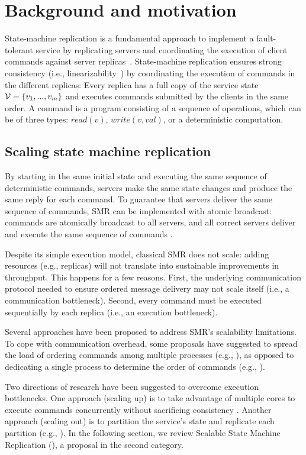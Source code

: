 \section{Background and motivation}
State-machine replication is a fundamental approach to implement a fault-tolerant service by replicating servers and coordinating the execution of client commands against server replicas~\cite{Lam78,Sch90}. 
State-machine replication ensures strong consistency (i.e., linearizability~\cite{Attiya04}) by coordinating the execution of commands in the different replicas: Every replica has a full copy of the service state $\mathcal{V} = \{v_1, ..., v_m\}$ and executes commands submitted by the clients in the same order. A command is a program consisting of a sequence of operations, which can be of three types: $read(v)$, $write(v, val)$, or a deterministic computation.

\subsection{Scaling state machine replication}
By starting in the same initial state and executing the same sequence of deterministic commands, servers make the same state changes and produce the same reply for each command. To guarantee that servers deliver the same sequence of commands, SMR can be implemented with atomic broadcast: commands are atomically broadcast to all servers, and all correct servers deliver and execute the same sequence of commands \cite{BJ87b,DSU04}.

Despite its simple execution model, classical SMR does not scale: adding resources (e.g., replicas) will not translate into sustainable improvements in throughput. This happens for a few reasons. First, the underlying communication protocol needed to ensure ordered message delivery may not scale itself (i.e., a communication bottleneck). Second, every command must be executed sequentially by each replica (i.e., an execution bottleneck).

Several approaches have been proposed to address SMR's scalability limitations. To cope with communication overhead, some proposals have suggested to spread the load of ordering commands among multiple processes (e.g., \cite{Moraru:2013gw,Mencius,Marandi:2012hb}), as opposed to dedicating a single process to determine the order of commands (e.g., \cite{CT96,Lamport:1998ea}).

Two directions of research have been suggested to overcome execution bottlenecks. One approach (scaling up) is to take advantage of multiple cores to execute commands concurrently without sacrificing consistency \cite{Kapritsos:2012um,Marandi:2014bj,Kotla:2004ep,Guo:2014jp}. Another approach (scaling out) is to partition the service's state and replicate each partition (e.g., \cite{Glendenning:2011kj,Marandi:2011dj}). In the following section, we review Scalable State Machine Replication (\ssmr), a proposal in the second category.

